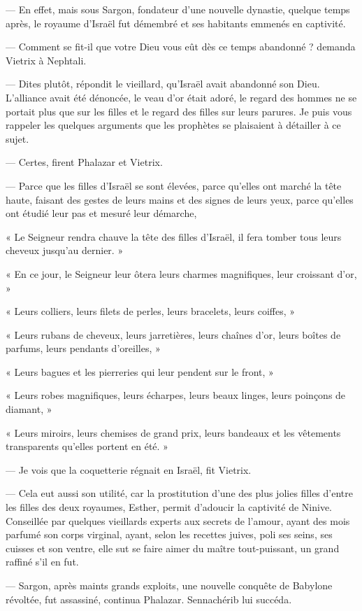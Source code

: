 \documentclass[a4paper, 11pt, oneside, polutonikogreek, french]{article}
\begin{document}
--- En effet, mais sous Sargon, fondateur d'une nouvelle dynastie, quelque temps après, le royaume d'Israël fut démembré et ses habitants emmenés en captivité.

--- Comment se fit-il que votre Dieu vous eût dès ce temps abandonné ? demanda Vietrix à Nephtali.

--- Dites plutôt, répondit le vieillard, qu'Israël avait abandonné son Dieu. L'alliance avait été dénoncée, le veau d'or était adoré, le regard des hommes ne se portait plus que sur les filles et le regard des filles sur leurs parures. Je puis vous rappeler les quelques arguments que les prophètes se plaisaient à détailler à ce sujet.

--- Certes, firent Phalazar et Vietrix.

--- Parce que les filles d'Israël se sont élevées, parce qu'elles ont marché la tête haute, faisant des gestes de leurs mains et des signes de leurs yeux, parce qu'elles ont étudié leur pas et mesuré leur démarche,

« Le Seigneur rendra chauve la tête des filles d'Israël, il fera tomber tous leurs cheveux jusqu'au dernier. »

« En ce jour, le Seigneur leur ôtera leurs charmes magnifiques, leur croissant d'or, »

« Leurs colliers, leurs filets de perles, leurs bracelets, leurs coiffes, »

« Leurs rubans de cheveux, leurs jarretières, leurs chaînes d'or, leurs boîtes de parfums, leurs pendants d'oreilles, »

« Leurs bagues et les pierreries qui leur pendent sur le front, »

« Leurs robes magnifiques, leurs écharpes, leurs beaux linges, leurs poinçons de diamant, »

« Leurs miroirs, leurs chemises de grand prix, leurs bandeaux et les vêtements transparents qu'elles portent en été. »

--- Je vois que la coquetterie régnait en Israël, fit Vietrix.

--- Cela eut aussi son utilité, car la prostitution d'une des plus jolies filles d'entre les filles des deux royaumes, Esther, permit d'adoucir la captivité de Ninive. Conseillée par quelques vieillards experts aux secrets de l'amour, ayant des mois parfumé son corps virginal, ayant, selon les recettes juives, poli ses seins, ses cuisses et son ventre, elle sut se faire aimer du maître tout-puissant, un grand raffiné s'il en fut.

--- Sargon, après maints grands exploits, une nouvelle conquête de Babylone révoltée, fut assassiné, continua Phalazar. Sennachérib lui succéda.
\end{document}
